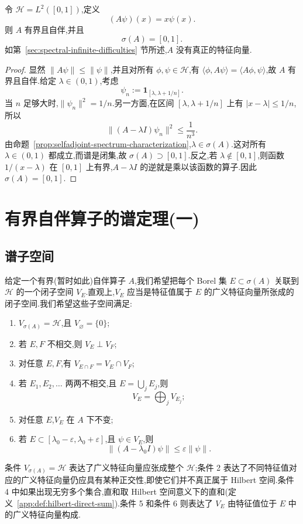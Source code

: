 \begin{example}[乘法算子的谱]\label{ex:multiplication-spectrum}
令 \(\mathcal{H}=L^{2}([0,1])\),定义
\[
(A\psi)(x)=x\psi(x).
\]
则 \(A\) 有界且自伴,并且
\[
\sigma(A)=[0,1].
\]
如第~\ref{sec:spectral-infinite-difficulties} 节所述,\(A\) 没有真正的特征向量.
\end{example}

\begin{proof}
显然 \(\|A\psi\|\leq\|\psi\|\),并且对所有 \(\phi,\psi\in\mathcal{H}\),有 \(\langle\phi,A\psi\rangle=\langle A\phi,\psi\rangle\),故 \(A\) 有界且自伴.给定 \(\lambda\in(0,1)\),考虑
\[
\psi_{n}:=\mathbf{1}_{[\lambda,\lambda+1/n]}.
\]
当 \(n\) 足够大时,\(\|\psi_{n}\|^{2}=1/n\).另一方面,在区间 \([\lambda,\lambda+1/n]\) 上有 \(|x-\lambda|\leq1/n\),所以
\[
\|(A-\lambda I)\psi_{n}\|^{2}\leq\frac{1}{n^{3}}.
\]
由命题~\ref{prop:selfadjoint-spectrum-characterization},\(\lambda\in\sigma(A)\).这对所有 \(\lambda\in(0,1)\) 都成立,而谱是闭集,故 \(\sigma(A)\supset[0,1]\).反之,若 \(\lambda\notin[0,1]\),则函数 \(1/(x-\lambda)\) 在 \([0,1]\) 上有界,\(A-\lambda I\) 的逆就是乘以该函数的算子.因此 \(\sigma(A)=[0,1]\).
\end{proof}

\section{有界自伴算子的谱定理(一)}
\label{sec:spectral-theorem-first}

\subsection{谱子空间}
\label{subsec:spectral-subspaces}

给定一个有界(暂时如此)自伴算子 \(A\),我们希望把每个 Borel 集 \(E\subset\sigma(A)\) 关联到 \(\mathcal{H}\) 的一个闭子空间 \(V_{E}\).直观上,\(V_{E}\) 应当是特征值属于 \(E\) 的广义特征向量所张成的闭子空间.我们希望这些子空间满足:
\begin{enumerate}
\item \(V_{\sigma(A)}=\mathcal{H}\),且 \(V_{\varnothing}=\{0\}\);
\item 若 \(E,F\) 不相交,则 \(V_{E}\perp V_{F}\);
\item 对任意 \(E,F\),有 \(V_{E\cap F}=V_{E}\cap V_{F}\);
\item 若 \(E_{1},E_{2},\ldots\) 两两不相交,且 \(E=\bigcup_{j}E_{j}\),则
\[
V_{E}=\bigoplus_{j}V_{E_{j}};
\]
\item 对任意 \(E\),\(V_{E}\) 在 \(A\) 下不变;
\item 若 \(E\subset[\lambda_{0}-\varepsilon,\lambda_{0}+\varepsilon]\),且 \(\psi\in V_{E}\),则
\[
\|(A-\lambda_{0}I)\psi\|\leq\varepsilon\|\psi\|.
\]
\end{enumerate}
条件 \(V_{\sigma(A)}=\mathcal{H}\) 表达了广义特征向量应张成整个 \(\mathcal{H}\);条件 2 表达了不同特征值对应的广义特征向量仍应具有某种正交性,即使它们并不真正属于 Hilbert 空间.条件 4 中如果出现无穷多个集合,直和取 Hilbert 空间意义下的直和(定义~\ref{app:def:hilbert-direct-sum}).条件 5 和条件 6 则表达了 \(V_{E}\) 由特征值位于 \(E\) 中的广义特征向量构成.

